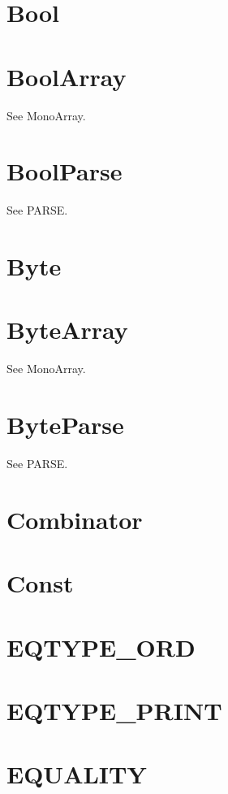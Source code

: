 \newpage
\section{Bool}


\newpage
\section{BoolArray}
See MonoArray.

\section{BoolParse}
See PARSE.

\newpage
\section{Byte}


\newpage
\section{ByteArray}
See MonoArray.

\section{ByteParse}
See PARSE.

\newpage
\section{Combinator}


\newpage
\section{Const}


\newpage
\section{EQTYPE\_ORD}


\newpage
\section{EQTYPE\_PRINT}


\newpage
\section{EQUALITY}



